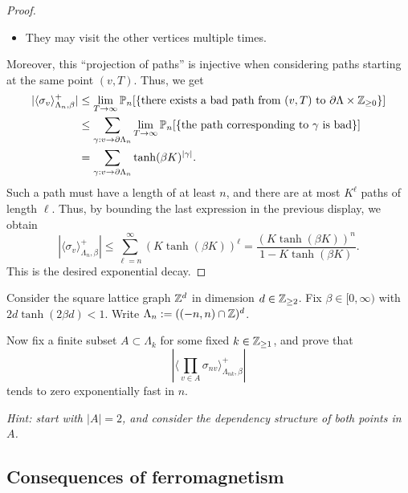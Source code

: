 \begin{proof}
\begin{itemize}
            the last step,
        \item They may visit the other vertices multiple times.
    \end{itemize}
    Moreover, this ``projection of paths'' is injective when considering paths starting
    at the same point $(v,T)$.
    Thus, we get
    \begin{align}
        |\langle\sigma_v\rangle_{\Lambda_n,\beta}^+|
        &\leq
        \lim_{T\to\infty}
        \P_n[\{\text{there exists a bad path from $(v,T)$ to $\partial\Lambda\times\Z_{\geq 0}$}\}]
        \\&\leq
        \sum_{\gamma:v\to\partial\Lambda_n}\lim_{T\to\infty} \P_n[\{\text{the path
        corresponding to $\gamma$ is bad}\}]
        \\&=
        \sum_{\gamma:v\to\partial\Lambda_n} \tanh(\beta K)^{|\gamma|}.
    \end{align}
    Such a path must have a length of at least $n$,
    and there are at most $K^\ell$ paths of length $\ell$.
    Thus, by bounding the last expression in the previous display, we obtain
    \begin{equation}
        |\langle\sigma_v\rangle_{\Lambda_n,\beta}^+|
        \leq
        \sum_{\ell=n}^\infty (K\tanh(\beta K))^\ell
        =  \frac{(K\tanh(\beta K))^n}{1-K\tanh(\beta K)}.
    \end{equation}
    This is the desired exponential decay.
\end{proof}

\begin{exercise}
    Consider the square lattice graph $\mathbb Z^d$ in dimension $d\in\mathbb Z_{\geq 2}$.
    Fix $\beta\in[0,\infty)$ with $2d\tanh(2\beta d)<1$.
    Write $\Lambda_n:=((-n,n)\cap\mathbb Z)^d$.

    Now fix a finite subset $A\subset\Lambda_k$ for some fixed $k\in\mathbb Z_{\geq 1}$,
    and prove that
    \[
        \textstyle
        |\langle \prod_{v\in A} \sigma_{nv} \rangle_{\Lambda_{nk},\beta}^+|
    \]
    tends to zero exponentially fast in $n$.

    \emph{Hint: start with $|A|=2$, and consider the dependency structure of both points in $A$.}
\end{exercise}

\subsection{Consequences of ferromagnetism}

